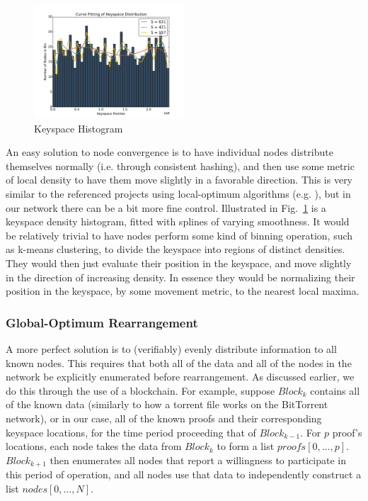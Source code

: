 \documentclass[10pt]{IEEEtran}
\begin{document}
\begin{figure}
\centering
\includegraphics[width=0.5\textwidth]{plots/histogram}
\caption{Keyspace Histogram}
\label{fig:Histo}
\end{figure}
\par An easy solution to node convergence is to have individual nodes distribute themselves normally (i.e. through consistent hashing), and then use some metric of local density to have them move slightly in a favorable direction. This is very similar to the referenced projects using local-optimum algorithms (e.g. \cite{forestiero2009self}), but in our network there can be a bit more fine control. Illustrated in Fig.~\ref{fig:Histo} is a keyspace density histogram, fitted with splines of varying smoothness. It would be relatively trivial to have nodes perform some kind of binning operation, such as k-means clustering, to divide the keyspace into regions of distinct densities. They would then just evaluate their position in the keyspace, and move slightly in the direction of increasing density. In essence they would be normalizing their position in the keyspace, by some movement metric, to the nearest local maxima. 


\subsubsection{Global-Optimum Rearrangement}
\par A more perfect solution is to (verifiably) evenly distribute information to all known nodes. This requires that both all of the data and all of the nodes in the network be explicitly enumerated before rearrangement. As discussed earlier, we do this through the use of a blockchain. For example, suppose $Block_k$ contains all of the known data (similarly to how a torrent file works on the BitTorrent network), or in our case, all of the known proofs and their corresponding keyspace locations, for the time period proceeding that of $Block_{k-1}$. For $p$ proof's locations, each node takes the data from $Block_k$ to form a list $proofs[0,\dots{},p]$. $Block_{k+1}$ then enumerates all nodes that report a willingness to participate in this period of operation, and all nodes use that data to independently construct a list $nodes[0,\dots ,N]$.  
\end{document}
